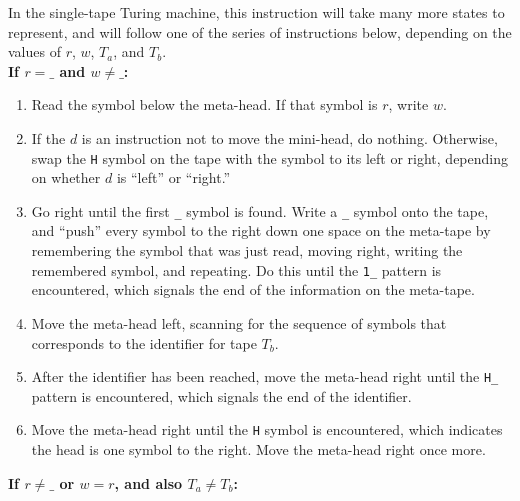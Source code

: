 \documentclass[11pt]{report}
\begin{document}
In the single-tape Turing machine, this instruction will take many more states to represent, and will follow one of the series of instructions below, depending on the values of $r$, $w$, $T_a$, and $T_b$. \\

\textbf{If $r = \texttt{\_}$ and $w \not= \texttt{\_}$:}

\begin{enumerate}

\item Read the symbol below the meta-head. If that symbol is $r$, write $w$.
\item If the $d$ is an instruction not to move the mini-head, do nothing. Otherwise, swap the \texttt{H} symbol on the tape with the symbol to its left or right, depending on whether $d$ is ``left'' or ``right.''
\item Go right until the first \texttt{\_} symbol is found. Write a \texttt{\_} symbol onto the tape, and ``push'' every symbol to the right down one space on the meta-tape by remembering the symbol that was just read, moving right, writing the remembered symbol, and repeating. Do this until the \texttt{1\_} pattern is encountered, which signals the end of the information on the meta-tape.
\item Move the meta-head left, scanning for the sequence of symbols that corresponds to the identifier for tape $T_b$.
\item After the identifier has been reached, move the meta-head right until the \texttt{H\_} pattern is encountered, which signals the end of the identifier.
\item Move the meta-head right until the \texttt{H} symbol is encountered, which indicates the head is one symbol to the right. Move the meta-head right once more.

\end{enumerate}

\textbf{If $r \not= \texttt{\_}$ or $w = r$, and also $T_a \not= T_b$:}
\end{document}
